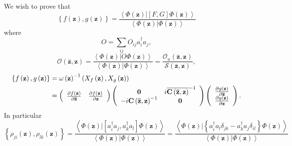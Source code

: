 \documentclass[aps,preprint]{revtex4}%
\begin{document}
We wish to prove that
\begin{equation}
\left\{  f\left(  \mathbf{z}\right)  ,g\left(  \mathbf{z}\right)  \right\}
=\frac{\left\langle \left.  \Phi\left(  \mathbf{z}\right)  \right\vert \left[
F,G\right]  \Phi\left(  \mathbf{z}\right)  \right\rangle }{\left\langle
\left.  \Phi\left(  \mathbf{z}\right)  \right\vert \Phi\left(  \mathbf{z}%
\right)  \right\rangle }%
\end{equation}
where
\begin{equation}
O=\sum_{ij}O_{ij}a_{i}^{\dagger}a_{j},
\end{equation}%
\begin{equation}
\mathcal{O}\left(  \mathbf{\bar{z},z}\right)  =\frac{\left\langle \left.
\Phi\left(  \mathbf{z}\right)  \right\vert O\Phi\left(  \mathbf{z}\right)
\right\rangle }{\left\langle \left.  \Phi\left(  \mathbf{z}\right)
\right\vert \Phi\left(  \mathbf{z}\right)  \right\rangle }=\frac
{\mathcal{O}_{u}\left(  \mathbf{\bar{z},z}\right)  }{\mathcal{S}\left(
\mathbf{\bar{z},z}\right)  },
\end{equation}
\begin{align}
\left\{  f\left(  \mathbf{z}\right)  ,g\left(  \mathbf{z}\right)  \right\}
&  =\omega\left(  \mathbf{z}\right)  ^{-1}\left(  X_{f}\left(  \mathbf{z}%
\right)  ,X_{g}\left(  \mathbf{z}\right)  \right)  \nonumber\\
&  =\left(
\begin{array}
[c]{cc}%
\frac{\partial f\left(  \mathbf{z}\right)  }{\partial\mathbf{\bar{z}}} &
\frac{\partial f\left(  \mathbf{z}\right)  }{\partial\mathbf{z}}%
\end{array}
\right)  \left(
\begin{array}
[c]{cc}%
\mathbf{0} & i\overline{\mathbf{C}\left(  \mathbf{\bar{z},z}\right)  }^{-1}\\
-i\mathbf{C}\left(  \mathbf{\bar{z},z}\right)  ^{-1} & \mathbf{0}%
\end{array}
\right)  \left(
\begin{array}
[c]{c}%
\frac{\partial g\left(  \mathbf{z}\right)  }{\partial\mathbf{\bar{z}}}\\
\frac{\partial g\left(  \mathbf{z}\right)  }{\partial\mathbf{z}}%
\end{array}
\right)  .
\end{align}
In particular
\begin{equation}
\left\{  \rho_{ji}\left(  \mathbf{z}\right)  ,\rho_{lk}\left(  \mathbf{z}%
\right)  \right\}  =\frac{\left\langle \left.  \Phi\left(  \mathbf{z}\right)
\right\vert \left[  a_{i}^{\dagger}a_{j},a_{k}^{\dagger}a_{l}\right]
\Phi\left(  \mathbf{z}\right)  \right\rangle }{\left\langle \left.
\Phi\left(  \mathbf{z}\right)  \right\vert \Phi\left(  \mathbf{z}\right)
\right\rangle }=\frac{\left\langle \left.  \Phi\left(  \mathbf{z}\right)
\right\vert \left\{  a_{i}^{\dagger}a_{l}\delta_{jk}-a_{k}^{\dagger}%
a_{j}\delta_{il}\right\}  \Phi\left(  \mathbf{z}\right)  \right\rangle
}{\left\langle \left.  \Phi\left(  \mathbf{z}\right)  \right\vert \Phi\left(
\mathbf{z}\right)  \right\rangle }%
\end{equation}%
\end{document}
